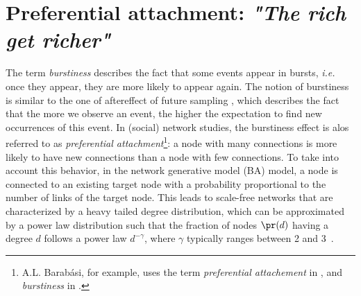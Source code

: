 \section{Preferential attachment: \emph{"The rich get richer"}}
\label{sec:burstiness}

The term \textit{burstiness} describes the fact that some events appear in bursts, \textit{i.e.} once they appear, they are more likely to appear again. The notion of burstiness is similar to the one of aftereffect of future sampling \cite{feller_68}, which describes the fact that the more we observe an event, the higher the expectation to find new occurrences of this event. In (social) network studies, the burstiness effect is alos referred to as \textit{preferential attachment}\footnote{A.L. Barab\'asi, for example, uses the term \textit{preferential attachement} in \cite{barabasi1999emergence}, and \textit{burstiness} in \cite{barabasi_burst}.}: a node with many connections is more likely to have new connections than a node with few connections. To take into account this behavior, in the network generative model  (BA) \cite{albert2002statistical} model, a node is connected to an existing target node with a probability proportional to the number of links of the target node. This leads to scale-free networks that are characterized by a heavy tailed degree distribution, which can be approximated by a power law distribution such that the fraction of nodes $\pr(d)$ having a degree $d$ follows a power law $d^{-\gamma}$, where $\gamma$ typically ranges between 2 and 3~\cite{barabasi1999emergence}. 

